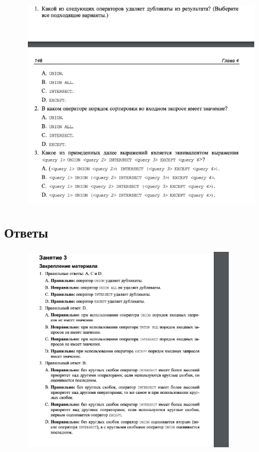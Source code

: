\begin{figure}[h!]
	\begin{center}
		\includegraphics[width=0.9\textwidth]{img/zakrep10.png}
	\end{center}
	\captionsetup{justification=centering}
\end{figure}
\clearpage

\subsection*{Ответы}

\begin{figure}[h!]
	\begin{center}
		\includegraphics[width=0.8\textwidth]{img/ans10.png}
	\end{center}
	\captionsetup{justification=centering}
\end{figure}




